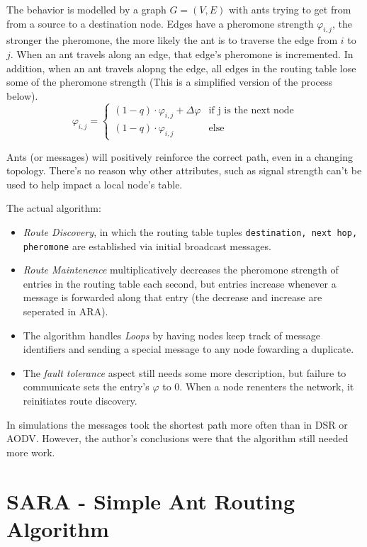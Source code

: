 \documentclass[a4paper]{article}
\begin{document}
The behavior is modelled by a graph $G = (V, E)$ with ants trying to get from from a source to a destination node. Edges have a pheromone strength $\varphi_{i,j}$, the stronger the pheromone, the more likely the ant is to traverse the edge from $i$ to $j$.  When an ant travels along an edge, that edge's pheromone is incremented.  In addition, when an ant travels alopng the edge, all edges in the routing table lose some of the pheromone strength (This is a simplified version of the process below).
\[
\varphi_{i,j} =
\begin{cases}
    (1-q) \cdot \varphi_{i,j} + \Delta\varphi & \text{if j is the next node}  \\
    (1-q) \cdot \varphi_{i,j}       & \text{else}
\end{cases}
\]

Ants (or messages) will positively reinforce the correct path, even in a changing topology.  There's no reason why other attributes, such as signal strength can't be used to help impact a local node's table.

The actual algorithm:
\begin{itemize}
    \item \textit{Route Discovery}, in which the routing table tuples \texttt{destination, next hop, pheromone} are established via initial broadcast messages.
    \item \textit{Route Maintenence} multiplicatively decreases the pheromone strength of entries in the routing table each second, but entries increase whenever a message is forwarded along that entry (the decrease and increase are seperated in ARA).
    \item The algorithm handles \textit{Loops} by having nodes keep track of message identifiers and sending a special message to any node fowarding a duplicate. 
    \item  The \textit{fault tolerance} aspect still needs some more description, but failure to communicate sets the entry's  $\varphi$ to 0.  When a node renenters the network, it reinitiates route discovery.
\end{itemize}


In simulations the messages took the shortest path more often than in DSR or AODV.  However, the author's conclusions were that the algorithm still needed more work.


\section{SARA - Simple Ant Routing Algorithm}
\end{document}
